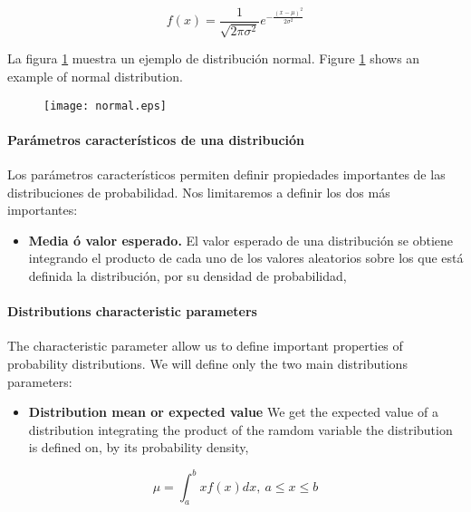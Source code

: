 \begin{equation*}
f(x)=\frac{1}{\sqrt{2\pi\sigma^2}}e^{-\frac{(x-\mu)^2}{2\sigma^2}}
\end{equation*}
\begin{paracol}{2}
\noindent La figura \ref{fig:normal} muestra un ejemplo de distribución normal.
\switchcolumn
\noindent Figure \ref{fig:normal} shows an example of normal distribution.
\end{paracol}
\begin{figure}
\centering
\texttt{[image: normal.eps]}
\label{fig:normal}
\end{figure}
\begin{paracol}{2}
\paragraph{Parámetros característicos de una distribución}

Los parámetros característicos permiten definir propiedades importantes de las distribuciones de probabilidad. Nos limitaremos a definir los dos más importantes:
\begin{itemize}
\item \textbf{Media ó valor esperado.} El valor esperado de una distribución se obtiene integrando el producto de cada uno de los valores aleatorios sobre los que está definida la distribución, por su densidad de probabilidad,
\end{itemize}
\switchcolumn
\paragraph{Distributions characteristic parameters}
The characteristic parameter  allow us to define important properties of probability distributions. We will define only the two main distributions parameters:
\begin{itemize}
	\item \textbf{Distribution mean or expected value} We get the expected value of a distribution integrating the product of the ramdom variable the distribution is defined on, by its probability density,   
\end{itemize}
\end{paracol}
\begin{equation*}
\mu = \int_a^b xf(x)dx, \ a\leqslant x \leqslant b
\end{equation*}
